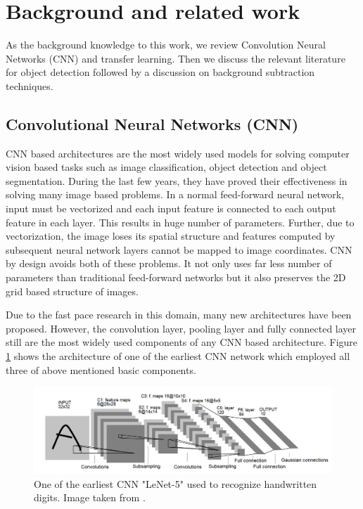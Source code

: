 \section{Background and related work}
As the background knowledge to this work, we review Convolution Neural Networks (CNN) and transfer learning. Then we discuss the relevant literature for object detection followed by a discussion on background subtraction techniques. 


\subsection{Convolutional Neural Networks (CNN)}
CNN based architectures\cite{lecun2010convolutional} are the most widely used models for solving computer vision based tasks such as image classification, object detection and object segmentation. During the last few years, they have proved their effectiveness in solving many image based problems\cite{lecun2010convolutional}. In a normal feed-forward neural network, input must be vectorized and each input feature is connected to each output feature in each layer. This results in huge number of parameters. Further, due to vectorization, the image loses its spatial structure and features computed by subsequent neural network layers cannot be mapped to image coordinates. CNN by design avoids both of these problems. It not only uses far less number of parameters than traditional feed-forward networks but it also preserves the 2D grid based structure of images\cite{arkar_thesis}.

Due to the fast pace research in this domain, many new architectures have been proposed. However, the convolution layer, pooling layer and fully connected layer still are the most widely used components of any CNN based architecture. Figure \ref{fig:lenet-5} shows the architecture of one of the earliest CNN network which employed all three of above mentioned basic components. 

\begin{figure}
    \centering
    \includegraphics[width=\linewidth]{images/lenet-5.PNG}
    \caption[LeNet-5]{One of the earliest CNN "LeNet-5" used to  recognize handwritten
digits. Image taken from \cite{lecun1998gradient}.}
    \label{fig:lenet-5}
\end{figure}


